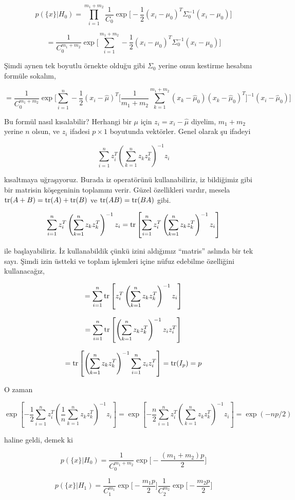 \documentclass[12pt,fleqn]{article}\usepackage{../../common}
\begin{document}
$$
p(\{x\}|H_0) =
\prod _{i=1}^{m_1+m_2} \frac{1}{C_0}
\exp \bigg[-\frac{ 1}{2}(x_i-\mu_0)^T\Sigma_0^{-1}(x_i-\mu_0) \bigg]
$$

$$ =
\frac{1}{C_0^{m_1+m_2}}
\exp \bigg[\sum _{i=1}^{m_1+m_2} -\frac{ 1}{2}(x_i-\mu_0)^T\Sigma_0^{-1}(x_i-\mu_0) \bigg]
$$

Şimdi aynen tek boyutlu örnekte olduğu gibi $\Sigma_0$ yerine onun kestirme
hesabını formüle sokalım,

$$
= \frac{1}{C_0^{m_1+m_2}} \exp \bigg[\sum _{i=1}^{n} 
-\frac{1}{2}(x_i-\hat{\mu})^T 
\bigg[
\frac{1}{m_1+m_2} \sum _{k=1}^{m_1+m_2} (x_k-\hat{\mu}_0) (x_k-\hat{\mu}_0)^T
\bigg]^{-1}
(x_i-\hat{\mu}_0) \bigg]
$$

Bu formül nasıl kısalabilir? Herhangi bir $\mu$ için $z_i=x_i-\hat{\mu}$
diyelim, $m_1+m_2$ yerine $n$ olsun, ve $z_i$ ifadesi $p \times 1$ boyutunda
vektörler. Genel olarak şu ifadeyi

$$ \sum_{i=1}^n z_i^T\left(\sum_{k=1}^n z_kz_k^T\right)^{-1}z_i $$

kısaltmaya uğraşıyoruz. Burada iz operatörünü kullanabiliriz, iz bildiğimiz gibi
bir matrisin köşegeninin toplamını verir. Güzel özellikleri vardır, mesela
$\operatorname{tr}(A+B)=\operatorname{tr}(A)+\operatorname{tr}(B)$ ve $\operatorname{tr}(AB)=\operatorname{tr}(BA)$ gibi.

$$
\sum_{i=1}^n z_i^T\left(\sum_{k=1}^n z_kz_k^T\right)^{-1}z_i  =
\operatorname{tr}\left[\sum_{i=1}^n z_i^T\left(\sum_{k=1}^n
  z_kz_k^T\right)^{-1}z_i\right] 
$$

ile başlayabiliriz. İz kullanabildik çünkü izini aldığımız ``matris'' aslında
bir tek sayı. Şimdi izin üstteki ve toplam işlemleri içine nüfuz edebilme
özelliğini kullanacağız,

$$= \sum_{i=1}^n\operatorname{tr}\left[ z_i^T\left(\sum_{k=1}^n z_kz_k^T\right)^{-1}z_i\right]$$

$$ = \sum_{i=1}^n\operatorname{tr}\left[ \left(\sum_{k=1}^n z_kz_k^T\right)^{-1}z_iz_i^T\right] $$

$$
= \operatorname{tr}\left[ \left(\sum_{k=1}^n z_kz_k^T\right)^{-1}
\sum_{i=1}^nz_iz_i^T\right] = \operatorname{tr}(I_p)=p 
$$

O zaman 

$$
\exp\left[-\frac12\sum_{i=1}^n z_i^T\left(\frac1n\sum_{k=1}^n
 z_kz_k^T\right)^{-1}z_i\right]  =
\exp\left[-\frac{n}2\sum_{i=1}^n
z_i^T\left(\sum_{k=1}^n z_kz_k^T\right)^{-1}z_i\right]=\exp(-np/2)
$$

haline geldi, demek ki

$$ p(\{x\}|H_0) = \frac{1}{C_0^{m_1+m_2}}\exp\bigg[-\frac{(m_1+m_2)p}{2}\bigg] $$

$$ p(\{x\}|H_1) =
\frac{1}{C_1^{m_1}}\exp\bigg[-\frac{m_1 p}{2}\bigg]
\frac{1}{C_2^{m_2}}\exp\bigg[-\frac{m_2 p}{2}\bigg]
$$
\end{document}
